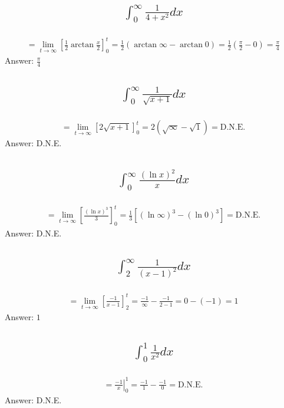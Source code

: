 \documentclass{article}
\begin{document}
\subsection{
	\begin{align*}
		\int_0^\infty{\frac{1}{4 + x^2} dx}
	\end{align*}
}
\begin{align*}
	= \lim_{t \to \infty} \left[ \frac{1}{2}\arctan{\frac{x}{2}} \right]_0^t = \frac{1}{2} \left( \arctan{\infty} - \arctan{0} \right) = \frac{1}{2} \left( \frac{\pi}{2} - 0 \right) = \frac{\pi}{4}
\end{align*}
Answer: $\frac{\pi}{4}$

\subsection{
	\begin{align*}
		\int_0^\infty{\frac{1}{\sqrt{x + 1}} dx}
	\end{align*}
}
\begin{align*}
	= \lim_{t \to \infty} \left[ 2\sqrt{x + 1} \right]_0^t = 2 \left( \sqrt{\infty} - \sqrt{1} \right) = \text{D.N.E.}
\end{align*}
Answer: D.N.E.

\subsection{
	\begin{align*}
		\int_0^\infty{\frac{(\ln{x})^2}{x} dx}
	\end{align*}
}
\begin{align*}
	= \lim_{t \to \infty} \left[ \frac{\left( \ln{x} \right)^3}{3} \right]_0^t = \frac{1}{3} \left[ \left( \ln{\infty} \right)^3 - \left( \ln{0} \right)^3 \right] = \text{D.N.E.}
\end{align*}
Answer: D.N.E.

\subsection{
	\begin{align*}
		\int_2^\infty{\frac{1}{(x - 1)^2} dx}
	\end{align*}
}
\begin{align*}
	= \lim_{t \to \infty} \left[ \frac{-1}{x - 1} \right]_2^t = \frac{-1}{\infty} - \frac{-1}{2 - 1} = 0 - (-1) = 1
\end{align*}
Answer: $1$

\subsection{
	\begin{align*}
		\int_0^1{\frac{1}{x^2} dx}
	\end{align*}
}
\begin{align*}
	= \left. \frac{-1}{x} \right|_{0}^{1} = \frac{-1}{1} - \frac{-1}{0} = \text{D.N.E.}
\end{align*}
Answer: D.N.E.
\end{document}
